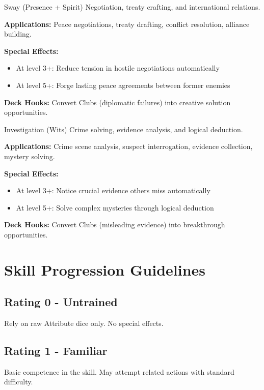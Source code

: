 \begin{skillbox}{Sway (Presence + Spirit)}
Negotiation, treaty crafting, and international relations.

\textbf{Applications:} Peace negotiations, treaty drafting, conflict resolution, alliance building.

\textbf{Special Effects:}
\begin{itemize}
    \item At level 3+: Reduce tension in hostile negotiations automatically
    \item At level 5+: Forge lasting peace agreements between former enemies
\end{itemize}

\textbf{Deck Hooks:} Convert Clubs (diplomatic failures) into creative solution opportunities.
\end{skillbox}

\begin{skillbox}{Investigation (Wits)}
Crime solving, evidence analysis, and logical deduction.

\textbf{Applications:} Crime scene analysis, suspect interrogation, evidence collection, mystery solving.

\textbf{Special Effects:}
\begin{itemize}
    \item At level 3+: Notice crucial evidence others miss automatically
    \item At level 5+: Solve complex mysteries through logical deduction
\end{itemize}

\textbf{Deck Hooks:} Convert Clubs (misleading evidence) into breakthrough opportunities.
\end{skillbox}

\section*{Skill Progression Guidelines}

\subsection*{Rating 0 - Untrained}
Rely on raw Attribute dice only. No special effects.

\subsection*{Rating 1 - Familiar}
Basic competence in the skill. May attempt related actions with standard difficulty.

